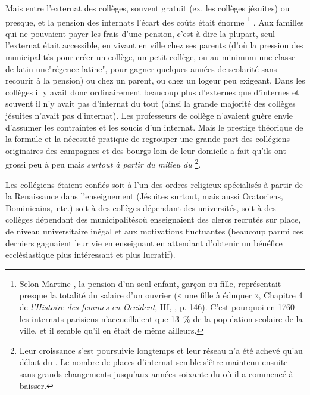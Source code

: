 Mais entre l'externat des collèges, souvent gratuit (ex. les collèges jésuites) ou presque, et la pension des internats l'écart des coûts était énorme%
\footnote{Selon Martine , la pension d'un seul enfant, garçon ou fille, représentait presque la totalité du salaire d'un ouvrier (« une fille à éduquer », Chapitre 4 de \emph{l'Histoire des femmes en Occident}, III, , p. 146). C'est pourquoi en 1760 les internats parisiens n'accueillaient que 13~\% de la population scolaire de la ville, et il semble qu'il en était de même ailleurs.}%
. Aux familles qui ne pouvaient payer les frais d'une pension, c'est-à-dire la plupart, seul l'externat était accessible, en vivant en ville chez ses parents (d'où la pression des municipalités pour créer un collège, un petit collège, ou au minimum une classe de latin une"régence latine", pour gagner quelques années de scolarité sans recourir à la pension) ou chez un parent, ou chez un logeur peu exigeant. Dans les collèges il y avait donc ordinairement beaucoup plus d'externes que d'internes et souvent il n'y avait pas d'internat du tout (ainsi la grande majorité des collèges jésuites n'avait pas d'internat). Les professeurs de collège n'avaient guère envie d'assumer les contraintes et les soucis d'un internat. Mais le prestige théorique de la formule et la nécessité pratique de regrouper une grande part des collégiens originaires des campagnes et des bourgs loin de leur domicile a fait qu'ils ont grossi peu à peu mais \emph{surtout à partir du milieu du }\footnote{Leur croissance s'est poursuivie longtemps et leur réseau n'a été achevé qu'au début du . Le nombre de places d'internat semble s'être maintenu ensuite sans grands changements jusqu'aux années soixante du  où il a commencé à baisser.}. 

 
 

Les collégiens étaient confiés soit à l'un des ordres religieux spécialisés à partir de la Renaissance dans l'enseignement (Jésuites surtout, mais aussi Oratoriens, Dominicains,~etc.) soit à des collèges dépendant des universités, soit à des collèges dépendant des municipalitésoù enseignaient des clercs recrutés sur place, de niveau universitaire inégal et aux motivations fluctuantes (beaucoup parmi ces derniers gagnaient leur vie en enseignant en attendant d'obtenir un bénéfice ecclésiastique plus intéressant et plus lucratif). 

